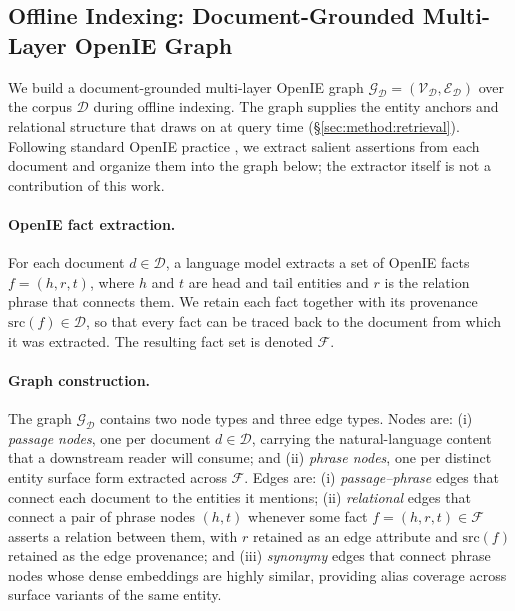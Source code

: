 \subsection{Offline Indexing: Document-Grounded Multi-Layer OpenIE Graph}
\label{sec:method:substrate}

We build a document-grounded multi-layer OpenIE graph
$\mathcal{G}_{\mathcal{D}}=(\mathcal{V}_{\mathcal{D}},\mathcal{E}_{\mathcal{D}})$
over the corpus $\mathcal{D}$ during offline indexing. The graph supplies
the entity anchors and relational structure that \methodname{} draws on at
query time (\S\ref{sec:method:retrieval}). Following standard OpenIE
practice \citep{angeli2015leveraging,gutierrez2025hipporag}, we extract
salient assertions from each document and organize them into the graph
below; the extractor itself is not a contribution of this work.

\paragraph{OpenIE fact extraction.}
For each document $d \in \mathcal{D}$, a language model extracts a set of
OpenIE facts $f = (h, r, t)$, where $h$ and $t$ are head and tail entities
and $r$ is the relation phrase that connects them. We retain each fact
together with its provenance $\mathrm{src}(f) \in \mathcal{D}$, so that
every fact can be traced back to the document from which it was extracted.
The resulting fact set is denoted $\mathcal{F}$.

\paragraph{Graph construction.}
The graph $\mathcal{G}_{\mathcal{D}}$ contains two node types and three
edge types. Nodes are: (i) \emph{passage nodes}, one per document
$d \in \mathcal{D}$, carrying the natural-language content that a
downstream reader will consume; and (ii) \emph{phrase nodes}, one per
distinct entity surface form extracted across $\mathcal{F}$. Edges are:
(i) \emph{passage--phrase} edges that connect each document to the
entities it mentions; (ii) \emph{relational} edges that connect a pair of
phrase nodes $(h, t)$ whenever some fact $f = (h, r, t) \in \mathcal{F}$
asserts a relation between them, with $r$ retained as an edge attribute
and $\mathrm{src}(f)$ retained as the edge provenance; and (iii)
\emph{synonymy} edges that connect phrase nodes whose dense embeddings
are highly similar, providing alias coverage across surface variants of
the same entity.

